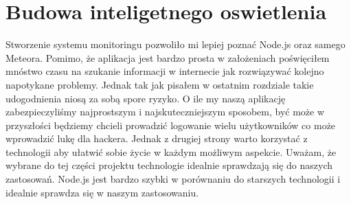 \documentclass[brudnopis]{xmgr}
\begin{document}
\section{Budowa inteligetnego oswietlenia}


\summary
Stworzenie systemu monitoringu pozwoliło mi lepiej poznać Node.js oraz samego Meteora. Pomimo, że aplikacja jest bardzo prosta w założeniach poświęciłem mnóstwo czasu na szukanie informacji w internecie jak rozwiązywać kolejno napotykane problemy. Jednak tak jak pisałem w ostatnim rozdziale takie udogodnienia niosą za sobą spore ryzyko. O ile my naszą aplikację zabezpieczyliśmy najprostszym i najskuteczniejszym sposobem, być może w przyszłości będziemy chcieli prowadzić logowanie wielu użytkowników co może wprowadzić lukę dla hackera. Jednak z drugiej strony warto korzystać z technologii aby ułatwić sobie życie w każdym możliwym aspekcie. 
Uważam, że wybrane do tej części projektu technologie idealnie sprawdzają się do naszych zastosowań. Node.js jest bardzo szybki w porównaniu do starszych technologii i idealnie sprawdza się w naszym zastosowaniu.

\appendix





\listoffigures

\oswiadczenie
\end{document}
